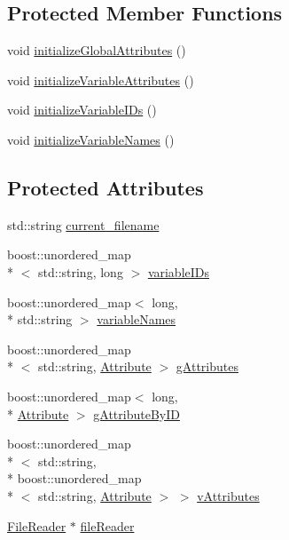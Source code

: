 \subsection*{Protected Member Functions}
\begin{DoxyCompactItemize}
\item 
void \hyperlink{classccmc_1_1_general_file_reader_a05e47e8ca0c282555e0eeb2f60f45075}{initialize\-Global\-Attributes} ()
\item 
void \hyperlink{classccmc_1_1_general_file_reader_a0d851978d821e4525d2f0c759b7a1f3b}{initialize\-Variable\-Attributes} ()
\item 
void \hyperlink{classccmc_1_1_general_file_reader_a9ed129fc4488e899b3260640d47a8d88}{initialize\-Variable\-I\-Ds} ()
\item 
void \hyperlink{classccmc_1_1_general_file_reader_a2151d69434928082138128fb3ebd3282}{initialize\-Variable\-Names} ()
\end{DoxyCompactItemize}
\subsection*{Protected Attributes}
\begin{DoxyCompactItemize}
\item 
std\-::string \hyperlink{classccmc_1_1_general_file_reader_a5ccab7d8bd4672ee5d6210288d5f41bd}{current\-\_\-filename}
\item 
boost\-::unordered\-\_\-map\\*
$<$ std\-::string, long $>$ \hyperlink{classccmc_1_1_general_file_reader_a70d799a29940fa982885ce8c0963942d}{variable\-I\-Ds}
\item 
boost\-::unordered\-\_\-map$<$ long, \\*
std\-::string $>$ \hyperlink{classccmc_1_1_general_file_reader_aa3a4c9091feaec12035bcc981299de47}{variable\-Names}
\item 
boost\-::unordered\-\_\-map\\*
$<$ std\-::string, \hyperlink{classccmc_1_1_attribute}{Attribute} $>$ \hyperlink{classccmc_1_1_general_file_reader_ae5d6c9e0cebe12ce9564b99f1175f319}{g\-Attributes}
\item 
boost\-::unordered\-\_\-map$<$ long, \\*
\hyperlink{classccmc_1_1_attribute}{Attribute} $>$ \hyperlink{classccmc_1_1_general_file_reader_a395e6335be8a0c569489a9635f6b9252}{g\-Attribute\-By\-I\-D}
\item 
boost\-::unordered\-\_\-map\\*
$<$ std\-::string, \\*
boost\-::unordered\-\_\-map\\*
$<$ std\-::string, \hyperlink{classccmc_1_1_attribute}{Attribute} $>$ $>$ \hyperlink{classccmc_1_1_general_file_reader_a806b25ba22db767f9f61ae578634ef08}{v\-Attributes}
\item 
\hyperlink{classccmc_1_1_file_reader}{File\-Reader} $\ast$ \hyperlink{classccmc_1_1_general_file_reader_a255d7c592bd3908186af70794f05c0ea}{file\-Reader}
\end{DoxyCompactItemize}


